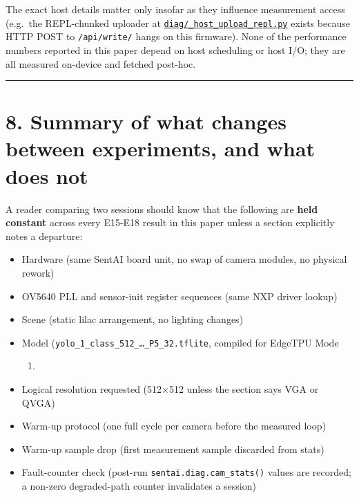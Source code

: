 The exact host details matter only insofar as they influence measurement
access (e.g.~the REPL-chunked uploader at
\href{../diag/_host_upload_repl.py}{\texttt{diag/\_host\_upload\_repl.py}}
exists because HTTP POST to \texttt{/api/write/} hangs on this
firmware). None of the performance numbers reported in this paper depend
on host scheduling or host I/O; they are all measured on-device and
fetched post-hoc.

\begin{center}\rule{0.5\linewidth}{0.5pt}\end{center}

\section{8. Summary of what changes between experiments, and what does
not}\label{summary-of-what-changes-between-experiments-and-what-does-not}

A reader comparing two sessions should know that the following are
\textbf{held constant} across every E15-E18 result in this paper unless
a section explicitly notes a departure:

\begin{itemize}
\tightlist
\item
  Hardware (same SentAI board unit, no swap of camera modules, no
  physical rework)
\item
  OV5640 PLL and sensor-init register sequences (same NXP driver lookup)
\item
  Scene (static lilac arrangement, no lighting changes)
\item
  Model (\texttt{yolo\_1\_class\_512\_…\_P5\_32.tflite}, compiled for
  EdgeTPU Mode

  \begin{enumerate}
  \def\labelenumi{\arabic{enumi})}
  \setcounter{enumi}{2}
  \tightlist
  \item
  \end{enumerate}
\item
  Logical resolution requested (512×512 unless the section says VGA or
  QVGA)
\item
  Warm-up protocol (one full cycle per camera before the measured loop)
\item
  Warm-up sample drop (first measurement sample discarded from stats)
\item
  Fault-counter check (post-run \texttt{sentai.diag.cam\_stats()} values
  are recorded; a non-zero degraded-path counter invalidates a session)
\end{itemize}

